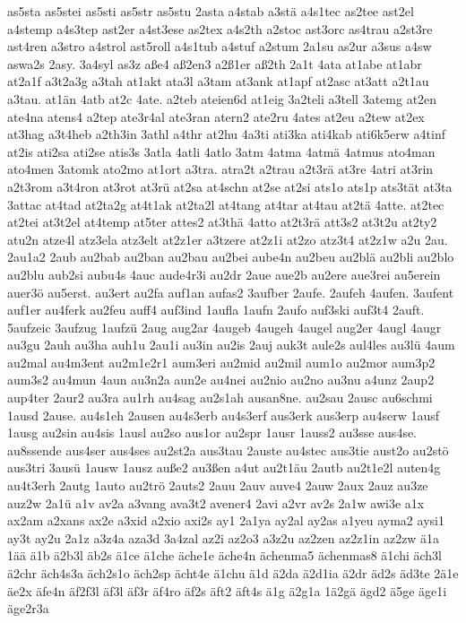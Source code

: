 {as5sta
as5stei
as5sti
as5str
as5stu
2asta
a4stab
a3stä
a4s1tec
as2tee
ast2el
a4stemp
a4s3tep
ast2er
a4st3ese
as2tex
a4s2th
a2stoc
ast3orc
as4trau
a2st3re
ast4ren
a3stro
a4strol
ast5roll
a4s1tub
a4stuf
a2stum
2a1su
as2ur
a3sus
a4sw
aswa2s
2asy.
3a4syl
as3z
aße4
aß2en3
a2ß1er
aß2th
2a1t
4ata
at1abe
at1abr
at2a1f
a3t2a3g
a3tah
at1akt
ata3l
a3tam
at3ank
at1apf
at2asc
at3att
a2t1au
a3tau.
at1än
4atb
at2c
4ate.
a2teb
ateien6d
at1eig
3a2teli
a3tell
3atemg
at2en
ate4na
atens4
a2tep
ate3r4al
ate3ran
atern2
ate2ru
4ates
at2eu
a2tew
at2ex
at3hag
a3t4heb
a2th3in
3athl
a4thr
at2hu
4a3ti
ati3ka
ati4kab
ati6k5erw
a4tinf
at2is
ati2sa
ati2se
atis3s
3atla
4atli
4atlo
3atm
4atma
4atmä
4atmus
ato4man
ato4men
3atomk
ato2mo
at1ort
a3tra.
atra2t
a2trau
a2t3rä
at3re
4atri
at3rin
a2t3rom
a3t4ron
at3rot
at3rü
at2sa
at4schn
at2se
at2si
ats1o
ats1p
ats3tät
at3ta
3attac
at4tad
at2ta2g
at4t1ak
at2ta2l
at4tang
at4tar
at4tau
at2tä
4atte.
at2tec
at2tei
at3t2el
at4temp
at5ter
attes2
at3thä
4atto
at2t3rä
att3s2
at3t2u
at2ty2
atu2n
atze4l
atz3ela
atz3elt
at2z1er
a3tzere
at2z1i
at2zo
atz3t4
at2z1w
a2u
2au.
2au1a2
2aub
au2bab
au2ban
au2bau
au2bei
aube4n
au2beu
au2blä
au2bli
au2blo
au2blu
aub2si
aubu4s
4auc
aude4r3i
au2dr
2aue
aue2b
au2ere
aue3rei
au5erein
auer3ö
au5erst.
au3ert
au2fa
auf1an
aufas2
3aufber
2aufe.
2aufeh
4aufen.
3aufent
auf1er
au4ferk
au2feu
auff4
auf3ind
1aufla
1aufn
2aufo
auf3ski
auf3t4
2auft.
5aufzeic
3aufzug
1aufzü
2aug
aug2ar
4augeb
4augeh
4augel
aug2er
4augl
4augr
au3gu
2auh
au3ha
auh1u
2au1i
au3in
au2is
2auj
auk3t
aule2s
aul4les
au3lü
4aum
au2mal
au4m3ent
au2m1e2r1
aum3eri
au2mid
au2mil
aum1o
au2mor
aum3p2
aum3s2
au4mun
4aun
au3n2a
aun2e
au4nei
au2nio
au2no
au3nu
a4unz
2aup2
aup4ter
2aur2
au3ra
au1rh
au4sag
au2s1ah
ausan8ne.
au2sau
2ausc
au6schmi
1ausd
2ause.
au4s1eh
2ausen
au4s3erb
au4s3erf
aus3erk
aus3erp
au4serw
1ausf
1ausg
au2sin
au4sis
1ausl
au2so
aus1or
au2spr
1ausr
1auss2
au3sse
aus4se.
au8ssende
aus4ser
aus4ses
au2st2a
aus3tau
2auste
au4stec
aus3tie
aust2o
au2stö
aus3tri
3ausü
1ausw
1ausz
auße2
au3ßen
a4ut
au2t1äu
2autb
au2t1e2l
auten4g
au4t3erh
2autg
1auto
au2trö
2auts2
2auu
2auv
auve4
2auw
2aux
2auz
au3ze
auz2w
2a1ü
a1v
av2a
a3vang
ava3t2
avener4
2avi
a2vr
av2s
2a1w
awi3e
a1x
ax2am
a2xans
ax2e
a3xid
a2xio
axi2s
ay1
2a1ya
ay2al
ay2as
a1yeu
ayma2
aysi1
ay3t
ay2u
2a1z
a3z4a
aza3d
3a4zal
az2i
az2o3
a3z2u
az2zen
az2z1in
az2zw
ä1a
1ää
ä1b
ä2b3l
äb2s
ä1ce
ä1che
äche1e
äche4n
ächenma5
ächenmas8
ä1chi
äch3l
ä2chr
äch4s3a
äch2s1o
äch2sp
ächt4e
ä1chu
ä1d
ä2da
ä2d1ia
ä2dr
äd2s
äd3te
2ä1e
äe2x
äfe4n
äf2f3l
äf3l
äf3r
äf4ro
äf2s
äft2
äft4s
ä1g
ä2g1a
1ä2gä
ägd2
ä5ge
äge1i
äge2r3a
}
